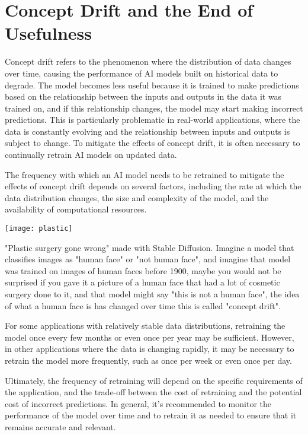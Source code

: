 \section{Concept Drift and the End of Usefulness}

Concept drift refers to the phenomenon where the distribution of data changes over time, causing the performance of AI models built on historical data to degrade. The model becomes less useful because it is trained to make predictions based on the relationship between the inputs and outputs in the data it was trained on, and if this relationship changes, the model may start making incorrect predictions. This is particularly problematic in real-world applications, where the data is constantly evolving and the relationship between inputs and outputs is subject to change. To mitigate the effects of concept drift, it is often necessary to continually retrain AI models on updated data.

The frequency with which an AI model needs to be retrained to mitigate the effects of concept drift depends on several factors, including the rate at which the data distribution changes, the size and complexity of the model, and the availability of computational resources.

\begin{marginfigure}[-5.5cm]
        \texttt{[image: plastic]}
        \caption{"Plastic surgery gone wrong" made with Stable Diffusion. Imagine a model that classifies images as "human face" or "not human face", and imagine that model was trained on images of human faces before 1900, maybe you would not be surprised if you gave it a picture of a human face that had a lot of cosmetic surgery done to it, and that model might say "this is not a human face", the idea of what a human face is has changed over time this is called "concept drift".}
\end{marginfigure}

For some applications with relatively stable data distributions, retraining the model once every few months or even once per year may be sufficient. However, in other applications where the data is changing rapidly, it may be necessary to retrain the model more frequently, such as once per week or even once per day.

Ultimately, the frequency of retraining will depend on the specific requirements of the application, and the trade-off between the cost of retraining and the potential cost of incorrect predictions. In general, it's recommended to monitor the performance of the model over time and to retrain it as needed to ensure that it remains accurate and relevant.

